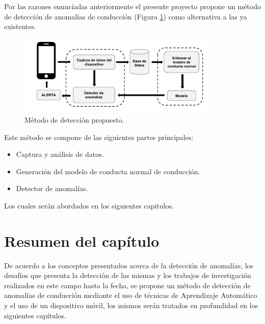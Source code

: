 \vspace{5mm} %

Por las razones enunciadas anteriormente el presente proyecto propone un m\'{e}todo de detecci\'{o}n de anomal\'{i}as de conducci\'{o}n (Figura \ref{fig:metodo}) como alternativa a las ya existentes.

\begin{figure}[h!]
  \begin{center}	\includegraphics[width=0.85\textwidth]{imagenes/metodo}
  \caption{M\'{e}todo de detecci\'{o}n propuesto.}
  \label{fig:metodo}
  \end{center}
\end{figure}

\vspace{5mm} %

Este m\'{e}todo se compone de las siguientes partes principales:

\vspace{5mm} %

\begin{itemize}
\item Captura y an\'{a}lisis de datos.
\item Generaci\'{o}n del modelo de conducta normal de conducci\'{o}n.
\item Detector de anomal\'{i}as.
\end{itemize} 

Los cuales ser\'{a}n abordados en los siguientes capitulos.

\section{Resumen del cap\'{i}tulo}

De acuerdo a los conceptos presentados acerca de la detecci\'{o}n de anomal\'{i}as, los desaf\'{i}os  que presenta la detecci\'{o}n de las mismas y los trabajos de investigaci\'{o}n realizados en este campo hasta la fecha, se propone un m\'{e}todo de detecci\'{o}n de anomal\'{i}as de conducci\'{o}n mediante el uso de t\'{e}cnicas de Aprendizaje Autom\'{a}tico y el uso de un dispositivo m\'{o}vil, los mismos ser\'{a}n tratados en profundidad en los siguientes cap\'{i}tulos. 